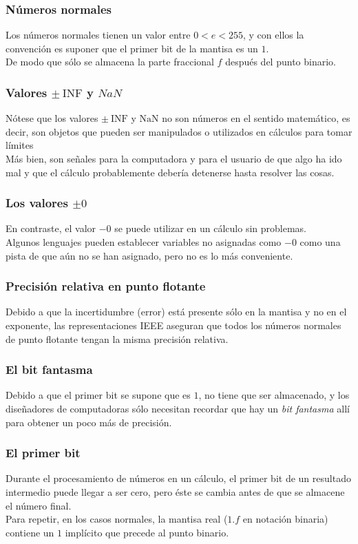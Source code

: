\documentclass[12pt]{beamer}
\begin{document}
\begin{frame}
\frametitle{Números normales}
Los números normales tienen un valor entre $0 < e < 255$, y con ellos la convención es suponer que el primer bit de la mantisa es un $1$.
\\
\bigskip
\pause
De modo que sólo se almacena la parte fraccional $f$ después del punto binario. 
\end{frame}
\begin{frame}
\frametitle{Valores $\pm \: \text{INF}$ y $NaN$ }
Nótese que los valores $\pm \: \text{INF}$ y $\text{NaN}$ no son números en el sentido matemático, es decir, son objetos que pueden ser manipulados o utilizados en cálculos para tomar límites
\\
\bigskip
\pause
Más bien, son señales para la computadora y para el usuario de que algo ha ido mal y que el cálculo probablemente debería detenerse hasta resolver las cosas.
\end{frame}
\begin{frame}
\frametitle{Los valores $\pm 0$}
En contraste, el valor $-0$ se puede utilizar en un cálculo sin problemas.
\\
\bigskip
\pause
Algunos lenguajes pueden establecer variables no asignadas como $-0$ como una pista de que aún no se han asignado, pero no es lo más conveniente.
\end{frame}
\begin{frame}
\frametitle{Precisión relativa en punto flotante}
Debido a que la incertidumbre (error) está presente sólo en la mantisa y no en el exponente, las representaciones IEEE aseguran que todos los números normales de punto flotante tengan la misma precisión relativa.
\end{frame}
\begin{frame}
\frametitle{El bit fantasma}
Debido a que el primer bit se supone que es $1$, no tiene que ser almacenado, y los diseñadores de computadoras sólo necesitan recordar que hay un \emph{bit fantasma} allí para obtener un poco más de precisión.
\end{frame}
\begin{frame}
\frametitle{El primer bit}
Durante el procesamiento de números en un cálculo, el primer bit de un resultado intermedio puede llegar a ser cero, pero éste se cambia antes de que se almacene el número final.
\\
\bigskip
\pause
Para repetir, en los casos normales, la mantisa real ($1.f$ en notación binaria) contiene un $1$ implícito que precede al punto binario.
\end{frame}
\end{document}
